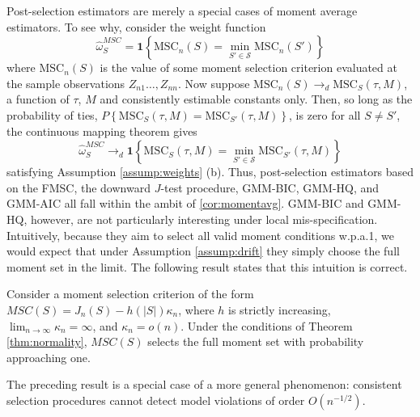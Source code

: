 Post-selection estimators are merely a special cases of moment average estimators.
To see why, consider the weight function
$$\widehat{\omega}_S^{MSC} = \mathbf{1}\left\{\mbox{MSC}_n(S) = \min_{S'\in \mathscr{S}} \mbox{MSC}_n(S')\right\}$$where $\mbox{MSC}_n(S)$ is the value of some moment selection criterion evaluated at the sample observations $Z_{n1}\hdots, Z_{nn}$. 
Now suppose $\mbox{MSC}_n(S) \rightarrow_d\mbox{MSC}_S(\tau,M)$, a function of $\tau$, $M$ and consistently estimable constants only. 
Then, so long as the probability of ties, $P\left\{\mbox{MSC}_S(\tau,M) = \mbox{MSC}_{S'}(\tau,M) \right\}$, is zero for all $S\neq S'$, the continuous mapping theorem gives 
	$$\widehat{\omega}_S^{MSC} \rightarrow_d \mathbf{1}\left\{\mbox{MSC}_S(\tau,M) = \min_{S'\in \mathscr{S}} \mbox{MSC}_{S'}(\tau,M)\right\}$$ 
satisfying Assumption \ref{assump:weights} (b). 
Thus, post-selection estimators based on the FMSC, the downward $J$-test procedure, GMM-BIC, GMM-HQ, and GMM-AIC all fall within the ambit of \ref{cor:momentavg}. 
GMM-BIC and GMM-HQ, however, are not particularly interesting under local mis-specification.
Intuitively, because they aim to select all valid moment conditions w.p.a.1, we would expect that under Assumption \ref{assump:drift} they simply choose the full moment set in the limit. 
The following result states that this intuition is correct. 
\begin{thm}
\label{pro:andrews}
Consider a moment selection criterion of the form $MSC(S) = J_n(S) - h(|S|)\kappa_n$, where $h$ is strictly increasing,  $\lim_{n\rightarrow \infty}\kappa_n = \infty$, and $\kappa_n = o(n)$. Under the conditions of Theorem \ref{thm:normality}, $MSC(S)$ selects the full moment set with probability approaching one.
\end{thm}
The preceding result is a special case of a more general phenomenon: consistent selection procedures cannot detect model violations of order $O(n^{-1/2})$.